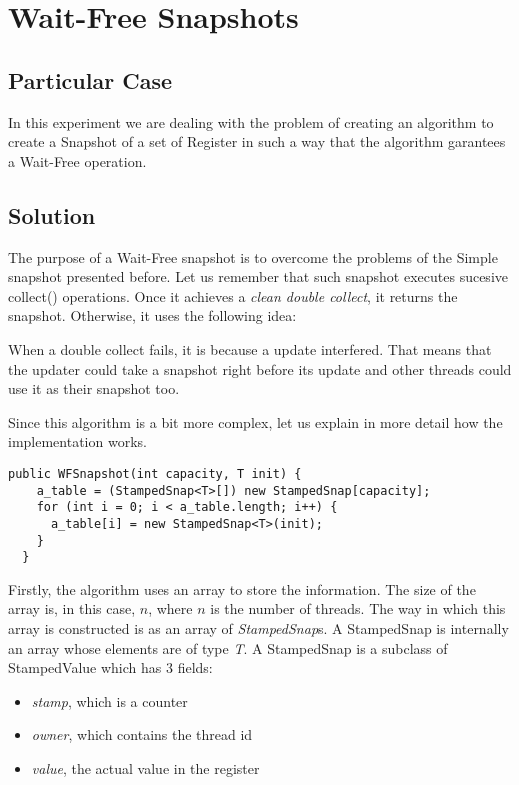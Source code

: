 \section{\textbf{Wait-Free Snapshots}}
\subsection{Particular Case}
\par
In this experiment we are dealing with the problem of creating an algorithm to
create a Snapshot of a set of Register in such a way that the algorithm
garantees a Wait-Free operation.
\par
\subsection{Solution}
\par
The purpose of a Wait-Free snapshot is to overcome the problems of the Simple
snapshot presented before. Let us remember that such snapshot executes sucesive
collect() operations. Once it achieves a \textit{clean double collect}, it
returns the snapshot. Otherwise, it uses the following idea:
\par
When a double collect fails, it is because a update interfered. That means that
the updater could take a snapshot right before its update and other threads
could use it as their snapshot too. 
\par
Since this algorithm is a bit more complex, let us explain in more detail how
the implementation works.
\par
\hfill
\begin{lstlisting}[style=numbers]
  public WFSnapshot(int capacity, T init) {
    a_table = (StampedSnap<T>[]) new StampedSnap[capacity];
    for (int i = 0; i < a_table.length; i++) {
      a_table[i] = new StampedSnap<T>(init);
    }   
  }
\end{lstlisting}
\hfill
\par
Firstly, the algorithm uses an array to store the information.
The size of the array is, in this case, $n$, where $n$ is the number of
threads. The way in which this array is constructed is as an array of
\textit{StampedSnap}s. A StampedSnap is internally an array whose elements are
of type \textit{T}. A StampedSnap is a subclass of StampedValue which has 3
fields:
\par
\begin{itemize}
\item \textit{stamp}, which is a counter
\item \textit{owner}, which contains the thread id
\item \textit{value}, the actual value in the register
\end{itemize}
